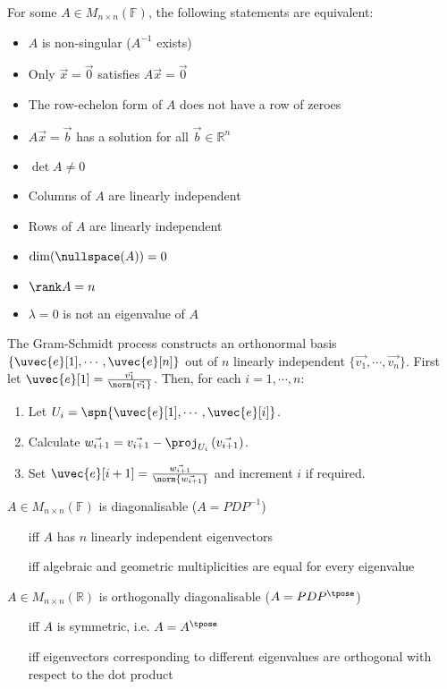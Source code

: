 \documentclass[10pt, a4paper]{article}
\newlength{\interwordspace}
\begin{document}
\begin{multicols}{2}
    For some \(A \in M_{n \times n}(\mathbb{F})\), the following statements are equivalent:
    \begin{itemize}
        \item \(A\) is non-singular (\(A^{-1}\) exists)
        \item Only \(\vec{x} = \vec{0}\) satisfies \(A \vec{x} = \vec{0}\)
        \item The row-echelon form of \(A\) does not have a row of zeroes
        \item \(A \vec{x} = \vec{b}\) has a solution for all \(\vec{b} \in \mathbb{R}^n\)
        \item \(\det A \neq 0\)
        \item Columns of \(A\) are linearly independent
        \item Rows of \(A\) are linearly independent
        \item \(\dim(\nullspace(A)) = 0\)
        \item \(\rank A = n\)
        \item \(\lambda = 0\) is not an eigenvalue of \(A\)
    \end{itemize}
    \vfill\columnbreak
    The Gram-Schmidt process constructs an orthonormal basis \(\{\uvec{e}[1], \cdots, \uvec{e}[n]\}\) out of \(n\) linearly
    independent \(\{\vec{v_1}, \cdots, \vec{v_n}\}\). First let \(\uvec{e}[1] = \frac{\vec{v_1}}{\norm{\vec{v_1}}}\).
    Then, for each \(i = 1, \cdots, n\):
    \begin{enumerate}
        \item Let \(U_i = \spn \{\uvec{e}[1], \cdots, \uvec{e}[i]\}\).
        \item Calculate \(\vec{w_{i+1}} = \vec{v_{i+1}} - \proj_{U_{i}} \left(\vec{v_{i+1}}\right)\).
        \item Set \(\uvec{e}[i+1] = \frac{\vec{w_{i+1}}}{\norm{\vec{w_{i+1}}}}\) and increment \(i\) if required.
    \end{enumerate}
    \(A \in M_{n \times n}(\mathbb{F})\) is diagonalisable (\(A = PDP^{-1}\))
    \begin{itemize}[leftmargin=1.0cm, labelsep=\interwordspace]
        \item[iff] \(A\) has \(n\) linearly independent eigenvectors
        \item[iff] algebraic and geometric multiplicities are equal for every eigenvalue
    \end{itemize}

    \(A \in M_{n \times n}(\mathbb{R})\) is orthogonally diagonalisable (\(A = PDP^{\tpose}\))
    \begin{itemize}[leftmargin=1.0cm, labelsep=\interwordspace]
        \item[iff] \(A\) is symmetric, i.e. \(A = A^{\tpose}\)
        \item[iff] eigenvectors corresponding to different eigenvalues are orthogonal with respect to the dot product 
    \end{itemize}


\end{multicols}
\end{document}
